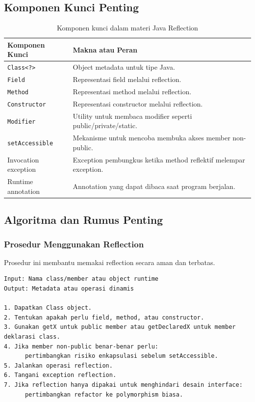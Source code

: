 \subsection{Komponen Kunci Penting}

\begin{table}[H]
\centering
\begin{tabularx}{\textwidth}{|L{0.28\textwidth}|X|}
\hline
\textbf{Komponen Kunci} & \textbf{Makna atau Peran} \\
\hline
\texttt{Class<?>} & Object metadata untuk tipe Java. \\
\hline
\texttt{Field} & Representasi field melalui reflection. \\
\hline
\texttt{Method} & Representasi method melalui reflection. \\
\hline
\texttt{Constructor} & Representasi constructor melalui reflection. \\
\hline
\texttt{Modifier} & Utility untuk membaca modifier seperti public/private/static. \\
\hline
\texttt{setAccessible} & Mekanisme untuk mencoba membuka akses member non-public. \\
\hline
Invocation exception & Exception pembungkus ketika method reflektif melempar exception. \\
\hline
Runtime annotation & Annotation yang dapat dibaca saat program berjalan. \\
\hline
\end{tabularx}
\caption{Komponen kunci dalam materi Java Reflection}
\label{tab:komponen-kunci-java-reflection}
\end{table}

\subsection{Algoritma dan Rumus Penting}

\subsubsection{Prosedur Menggunakan Reflection}

\begin{jawab}
Prosedur ini membantu memakai reflection secara aman dan terbatas.
\end{jawab}

\begin{lstlisting}[caption={Pseudocode penggunaan reflection}, label={lst:reflection-procedure}]
Input: Nama class/member atau object runtime
Output: Metadata atau operasi dinamis

1. Dapatkan Class object.
2. Tentukan apakah perlu field, method, atau constructor.
3. Gunakan getX untuk public member atau getDeclaredX untuk member deklarasi class.
4. Jika member non-public benar-benar perlu:
      pertimbangkan risiko enkapsulasi sebelum setAccessible.
5. Jalankan operasi reflection.
6. Tangani exception reflection.
7. Jika reflection hanya dipakai untuk menghindari desain interface:
      pertimbangkan refactor ke polymorphism biasa.
\end{lstlisting}

